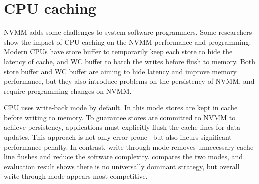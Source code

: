 \section{CPU caching} 
\label{sec:CPU caching}

NVMM adds some challenges to system software programmers.
Some researchers~\cite{CPUcaching}
show the impact of CPU caching on the NVMM performance
and programming. Modern CPUs have store buffer to temporarily keep each store
to hide the latency of cache, and WC buffer to batch the writes before
flush to memory. Both store buffer and WC buffer are aiming to hide latency
and improve memory performance, but they also introduce problems on the
persistency of NVMM, and require programming changes on NVMM.

CPU uses write-back mode by default. In this mode stores are kept in cache
before writing to memory. To guarantee stores are committed to NVMM to achieve
persistency, applications must explicitly flush the cache lines for data
updates. This approach is not only error-prone~\cite{singlelock}
but also incurs significant
performance penalty. In contrast, write-through mode removes unnecessary
cache line flushes and reduce the software complexity. \cite{CPUcaching}
compares the two 
modes, and evaluation result shows there is no universally dominant strategy,
but overall write-through mode appears most competitive.
